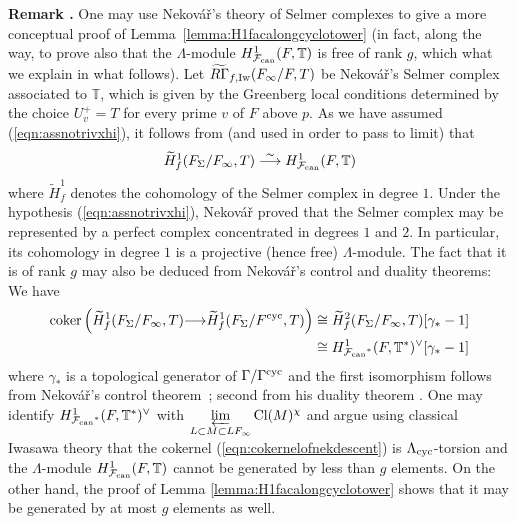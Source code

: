 \documentclass[12pt]{amsart}
\numberwithin{equation}{section}
\newenvironment{rem}{\par\medskip\noindent\refstepcounter{thm}
\bgroup{\hspace*{-0.15 cm}\bf{Remark} \thethm.}\bgroup}{\egroup
\egroup\par\medskip} \parskip 2pt
\begin{document}
\begin{rem}
\label{rem:freenessconceptually}
One may use Nekov\'a\v{r}'s theory of Selmer complexes to give a more conceptual proof of Lemma~\ref{lemma:H1facalongcyclotower} (in fact, along the way, to prove also that the ${\Lambda}$-module $H^1_{\mathcal{F}_{\textup{\lowercase{can}}}}(F,{\mathbb{T}})$ is free of rank $g$, which what we explain in what follows). Let $\widetilde{R\Gamma}_{f,\textup{Iw}}(F_\infty/F,T)$ be Nekov\'a\v{r}'s Selmer complex associated to ${\mathbb{T}}$, which is given by the Greenberg local conditions determined by the choice $U_v^+=T$ for every prime $v$ of $F$ above $p$. As we have assumed (\ref{eqn:assnotrivxhi}), it follows from \cite[Lemma 9.6.3]{nekovar06} (and \cite[Proposition 8.8.6]{nekovar06} used in order to pass to limit) that
$$\widetilde{H}^1_{f}(F_{\Sigma}/F_{\infty},T) \stackrel{\sim}{\longrightarrow} H^1_{\mathcal{F}_{\textup{\lowercase{can}}}}(F,{\mathbb{T}})$$
where $\widetilde{H}^1_{f}$ denotes the cohomology of the Selmer complex in degree $1$. Under the hypothesis (\ref{eqn:assnotrivxhi}), Nekov\'a\v{r} proved that the Selmer complex may be represented by a perfect complex concentrated in degrees $1$ and $2$. In particular, its cohomology in degree $1$ is a projective (hence free) ${\Lambda}$-module. The fact that it is of rank $g$ may also be deduced from Nekov\'a\v{r}'s control and duality theorems: We have
\begin{align}\label{eqn:cokernelofnekdescent}\textup{coker}\left(\widetilde{H}^1_{f}(F_{\Sigma}/F_{\infty},T) {\longrightarrow} \widetilde{H}^1_{f}(F_{\Sigma}/F^{\textup{cyc}},T)\right)&\cong \widetilde{H}^2_{f}(F_{\Sigma}/F_{\infty},T)[\gamma_*-1]\\
\notag&\cong H^1_{{\mathcal{F}_{\textup{\lowercase{can}}}}^*}(F,{\mathbb{T}}^*)^{\vee}[\gamma_*-1]\end{align}
where $\gamma_*$ is a topological generator of $\Gamma/\Gamma^{\textup{cyc}}$ and the first isomorphism follows from Nekov\'a\v{r}'s control theorem \cite[8.10.1]{nekovar06}\,;  second from his duality theorem \cite[8.9.6.2]{nekovar06}. One may identify $H^1_{{\mathcal{F}_{\textup{\lowercase{can}}}}^*}(F,{\mathbb{T}}^*)^{\vee}$ with $\displaystyle{\varprojlim _{L\subset M\subset LF_\infty} \textup{Cl}(M)^\chi}$ and argue using classical Iwasawa theory that the cokernel  (\ref{eqn:cokernelofnekdescent}) is ${\Lambda}_{\textup{cyc}}$-torsion and the ${\Lambda}$-module $H^1_{\mathcal{F}_{\textup{\lowercase{can}}}}(F,{\mathbb{T}})$ cannot be generated by less than $g$ elements. On the other hand, the proof of Lemma \ref{lemma:H1facalongcyclotower} shows that it may be generated by at most $g$ elements as well.
\end{rem}
\end{document}
